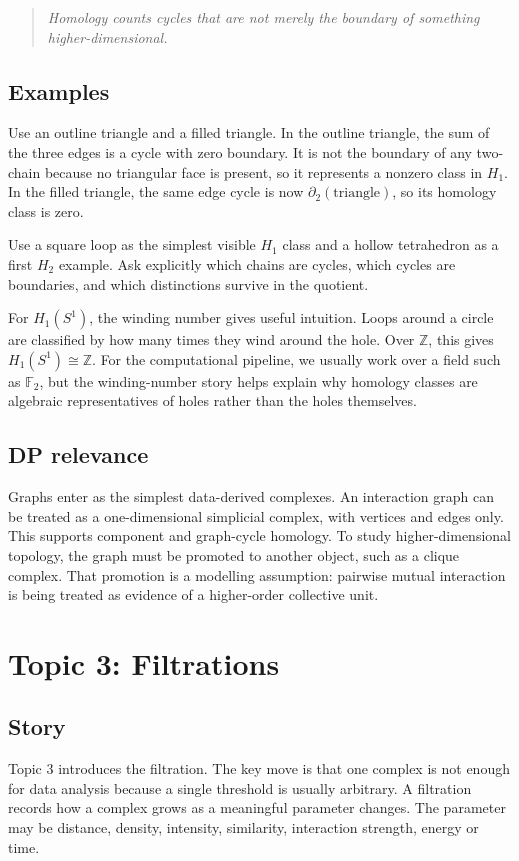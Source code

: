 \documentclass[11pt,a4paper]{article}
\newcommand{\weekheading}[2]{%
\section*{Topic #1: #2}
\addcontentsline{toc}{section}{Topic #1: #2}
}
\newcommand{\planningbox}[2]{%
\subsection*{#1}
#2
}
\newcommand{\phrase}[1]{%
\begin{quote}
\emph{#1}
\end{quote}
}
\begin{document}
\phrase{Homology counts cycles that are not merely the boundary of something
higher-dimensional.}

\planningbox{Examples}{
Use an outline triangle and a filled triangle. In the outline triangle, the sum
of the three edges is a cycle with zero boundary. It is not the boundary of any
two-chain because no triangular face is present, so it represents a nonzero
class in \(H_1\). In the filled triangle, the same edge cycle is now
\(\partial_2(\text{triangle})\), so its homology class is zero.

Use a square loop as the simplest visible \(H_1\) class and a hollow tetrahedron
as a first \(H_2\) example. Ask explicitly which chains are cycles, which cycles
are boundaries, and which distinctions survive in the quotient.

For \(H_1(S^1)\), the winding number gives useful intuition. Loops around a
circle are classified by how many times they wind around the hole. Over
\(\mathbb{Z}\), this gives \(H_1(S^1)\cong \mathbb{Z}\). For the computational
pipeline, we usually work over a field such as \(\mathbb{F}_2\), but the
winding-number story helps explain why homology classes are algebraic
representatives of holes rather than the holes themselves.
}

\planningbox{DP relevance}{
Graphs enter as the simplest data-derived complexes. An interaction graph can
be treated as a one-dimensional simplicial complex, with vertices and edges
only. This supports component and graph-cycle homology. To study
higher-dimensional topology, the graph must be promoted to another object, such
as a clique complex. That promotion is a modelling assumption: pairwise mutual
interaction is being treated as evidence of a higher-order collective unit.
}

\weekheading{3}{Filtrations}

\planningbox{Story}{
Topic 3 introduces the filtration. The key move is that one complex is not
enough for data analysis because a single threshold is usually arbitrary. A
filtration records how a complex grows as a meaningful parameter changes. The
parameter may be distance, density, intensity, similarity, interaction
strength, energy or time.
}
\end{document}
